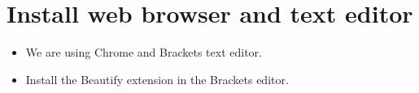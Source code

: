 \section{Install web browser and text editor}
\begin{itemize}
    \item We are using Chrome and Brackets text editor.
    \item Install the Beautify extension in the Brackets editor.
\end{itemize}